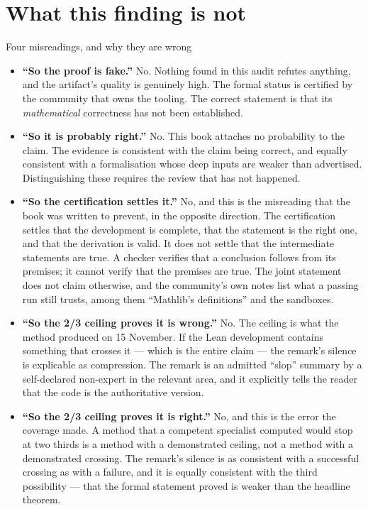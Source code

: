 \section{What this finding is not}\begin{mythbox}{Four misreadings, and why they are wrong}
\begin{itemize}
\item \textbf{``So the proof is fake.''} No. Nothing found in this audit
refutes anything, and the artifact's quality is genuinely high. The formal
status is certified by the community that owns the tooling. The correct
statement is that its \emph{mathematical} correctness has not been
established.

\item \textbf{``So it is probably right.''} No. This book attaches no
probability to the claim. The evidence is consistent with the claim being
correct, and equally consistent with a formalisation whose deep inputs are
weaker than advertised. Distinguishing these requires the review that has not
happened.

\item \textbf{``So the certification settles it.''} No, and this is the
misreading that the book was written to prevent, in the opposite direction.
The certification settles that the development is complete, that the
statement is the right one, and that the derivation is valid. It does not
settle that the intermediate statements are true. A checker verifies that a
conclusion follows from its premises; it cannot verify that the premises
are true. The joint statement does not claim otherwise, and the community's
own notes list what a passing run still trusts, among them ``Mathlib's
definitions'' and the sandboxes.

\item \textbf{``So the 2/3 ceiling proves it is wrong.''} No. The ceiling is
what the method produced on 15 November. If the Lean development contains
something that crosses it --- which is the entire claim --- the remark's
silence is explicable as compression. The remark is an admitted ``slop''
summary by a self-declared non-expert in the relevant area, and it explicitly
tells the reader that the code is the authoritative version.

\item \textbf{``So the 2/3 ceiling proves it is right.''} No, and this is the
error the coverage made. A method that a competent specialist computed would
stop at two thirds is a method with a demonstrated ceiling, not a method with
a demonstrated crossing. The remark's silence is as consistent with a
successful crossing as with a failure, and it is equally consistent with the
third possibility --- that the formal statement proved is weaker than the
headline theorem.
\end{itemize}
\end{mythbox}

